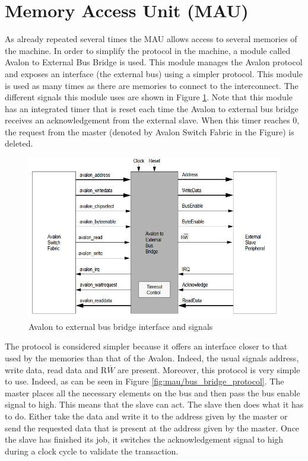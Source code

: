 \section{Memory Access Unit (MAU)}

As already repeated several times the MAU allows access to several memories of the machine. In order 
to simplify the protocol in the machine, a module called Avalon to External Bus Bridge is used. This 
module manages the Avalon protocol and exposes an interface (the external bus) using a simpler 
protocol. This module is used as many times as there are memories to connect to the interconnect.
The different signals this module uses are shown in Figure \ref{fig:mau/bus_bridge}. Note that this
module has an integrated timer that is reset each time the Avalon to external bus bridge receives
an acknowledgement from the external slave. When this timer reaches 0, the request from the master 
(denoted by Avalon Switch Fabric in the Figure) is deleted.

\begin{figure}[H]
    \center
    \includegraphics[scale=0.8]{"Chapter6-MAU_CTRLU/res/external_bus_bridge.PNG"}
    \caption{Avalon to external bus bridge interface and signals}
    \label{fig:mau/bus_bridge}
\end{figure}

The protocol is considered simpler because it offers an interface closer to that used by the memories 
than that of the Avalon. Indeed, the usual signals address, write data, read data and R$\overline{W}$ are 
present. Moreover, this protocol is very simple to use. Indeed, as can be seen in Figure \ref{fig:mau/bus_bridge_protocol}. The master 
places all the necessary elements on the bus and then pass the bus enable signal to high. This means 
that the slave can act. The slave then does what it has to do. Either take the data and write it to 
the address given by the master or send the requested data that is present at the address given by 
the master. Once the slave has finished its job, it switches the acknowledgement signal to high 
during a clock cycle to validate the transaction. 

